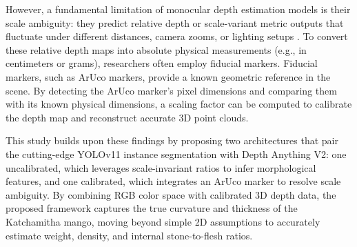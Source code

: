 However, a fundamental limitation of monocular depth estimation models is their
scale ambiguity: they predict relative depth or scale-variant metric outputs that
fluctuate under different distances, camera zooms, or lighting setups
\cite{depthanythingv2}. To convert these relative depth maps into absolute
physical measurements (e.g., in centimeters or grams), researchers often employ
fiducial markers. Fiducial markers, such as ArUco markers, provide a known
geometric reference in the scene. By detecting the ArUco marker's pixel
dimensions and comparing them with its known physical dimensions, a scaling
factor can be computed to calibrate the depth map and reconstruct accurate 3D
point clouds. 

This study builds upon these findings by proposing two architectures that pair
the cutting-edge YOLOv11 instance segmentation with Depth Anything V2: one
uncalibrated, which leverages scale-invariant ratios to infer morphological
features, and one calibrated, which integrates an ArUco marker to resolve scale
ambiguity. By combining RGB color space with calibrated 3D depth data, the
proposed framework captures the true curvature and thickness of the Katchamitha
mango, moving beyond simple 2D assumptions to accurately estimate weight,
density, and internal stone-to-flesh ratios.
